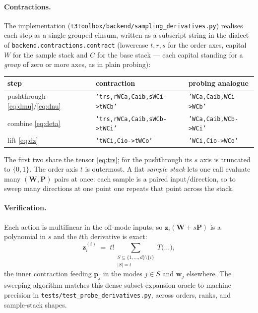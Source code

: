 \documentclass[11pt]{article}
\theoremstyle{definition}
\theoremstyle{plain}
\begin{document}
\paragraph{Contractions.}
The implementation (\texttt{t3toolbox/backend/sampling\_derivatives.py}) realises each step as a
single grouped einsum, written as a subscript string in the dialect of
\texttt{backend.contractions.contract} (lowercase $t,r,s$ for the order axes, capital $W$ for the
sample stack and $C$ for the base stack --- each capital standing for a \emph{group} of zero or more
axes, as in plain probing):
\begin{center}
\begin{tabular}{lll}
\toprule
step & contraction & probing analogue \\
\midrule
pushthrough \eqref{eq:dmu}/\eqref{eq:dnu}
  & \texttt{'trs,rWCa,Caib,sWCi->tWCb'} & \texttt{'WCa,Caib,WCi->WCb'} \\
combine \eqref{eq:deta}
  & \texttt{'trs,rWCa,Caib,sWCb->tWCi'} & \texttt{'WCa,Caib,WCb->WCi'} \\
lift \eqref{eq:dz}
  & \texttt{'tWCi,Cio->tWCo'} & \texttt{'WCi,Cio->WCo'} \\
\bottomrule
\end{tabular}
\end{center}
The first two share the tensor \eqref{eq:trs}; for the pushthrough its $s$ axis is truncated to
$\{0,1\}$. The order axis $t$ is outermost. A flat \emph{sample stack} lets one call evaluate many
$(\mathbf W, \mathbf P)$ pairs at once: each sample is a paired input/direction, so to sweep many
directions at one point one repeats that point across the stack.

\paragraph{Verification.}
Each action is multilinear in the off-mode inputs, so $\mathbf z_i(\mathbf W + s\mathbf P)$ is a
polynomial in $s$ and the $t$th derivative is exact:
\begin{equation}
  \label{eq:oracle}
  \mathbf z_i^{(t)} \;=\; t!\!\!\sum_{\substack{S \subseteq \{1,\dots,d\}\setminus\{i\}\\ |S| = t}}
  T\big(\dots\big),
\end{equation}
the inner contraction feeding $\mathbf p_j$ in the modes $j \in S$ and $\mathbf w_j$ elsewhere. The
sweeping algorithm matches this dense subset-expansion oracle to machine precision in
\texttt{tests/\allowbreak test\_probe\_derivatives.py}, across orders, ranks, and sample-stack shapes.
\end{document}
